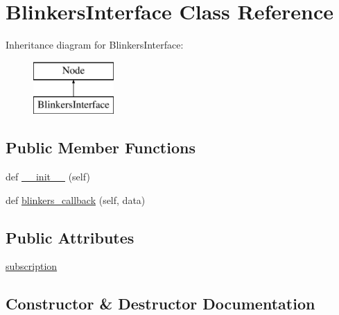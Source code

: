\hypertarget{classtoxic__hardware_1_1blinkers__interface_1_1BlinkersInterface}{}\section{Blinkers\+Interface Class Reference}
\label{classtoxic__hardware_1_1blinkers__interface_1_1BlinkersInterface}
Inheritance diagram for Blinkers\+Interface\+:\begin{figure}[H]
\begin{center}
\leavevmode
\includegraphics[height=2.000000cm]{db/db2/classtoxic__hardware_1_1blinkers__interface_1_1BlinkersInterface}
\end{center}
\end{figure}
\subsection*{Public Member Functions}
\begin{DoxyCompactItemize}
\item 
def \mbox{\hyperlink{classtoxic__hardware_1_1blinkers__interface_1_1BlinkersInterface_ae64f0875afe3067b97ba370b354b9213}{\+\_\+\+\_\+init\+\_\+\+\_\+}} (self)
\item 
def \mbox{\hyperlink{classtoxic__hardware_1_1blinkers__interface_1_1BlinkersInterface_a74f43bc48b49ce4860b4fe27ab96fdda}{blinkers\+\_\+callback}} (self, data)
\end{DoxyCompactItemize}
\subsection*{Public Attributes}
\begin{DoxyCompactItemize}
\item 
\mbox{\hyperlink{classtoxic__hardware_1_1blinkers__interface_1_1BlinkersInterface_a4b0698733c4dfaffe8e2b4cd952b6f82}{subscription}}
\end{DoxyCompactItemize}


\subsection{Constructor \& Destructor Documentation}
\mbox{\label{classtoxic__hardware_1_1blinkers__interface_1_1BlinkersInterface_ae64f0875afe3067b97ba370b354b9213}} 
